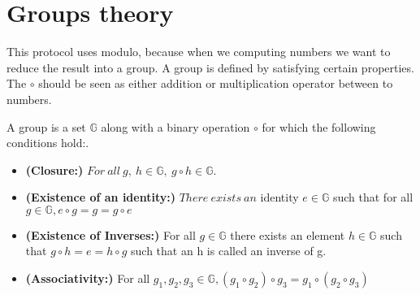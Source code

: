 \section{Groups theory}
This protocol uses modulo, because when we computing numbers we want to reduce the result into a group. A group is defined by satisfying certain properties. The \begin{math} \circ \end{math} should be seen as either addition or multiplication operator between to numbers. 
\begin{defi}
A \textnormal{group} is a set \begin{math}\mathbb{G}\end{math} along with a binary operation \begin{math}\circ \end{math} for which the following conditions hold:.
\begin{itemize}
\item \textnormal{\textbf{(Closure:)}}  \begin{math} For \ all \ g, \ h \in \mathbb{G},\ g \circ h \in \mathbb{G} \end{math}.
\item \textnormal{\textbf{(Existence of an identity:)}} \begin{math} There \ exists \ an \end{math} \textnormal{identity} \begin{math} e \in \mathbb{G} \end{math} such that for  all \begin{math} g \in \mathbb{G}, e \circ g = g =g \circ e \end{math}
\item \textnormal{\textbf{(Existence of Inverses:)}} For all \begin{math}g \in \mathbb{G}\end{math} there exists an element \begin{math}h \in \mathbb{G}\end{math} such that \begin{math}g \circ h = e =h \circ g \end{math} such that an h is called an \textnormal{inverse} of g.
\item \textnormal{\textbf{(Associativity:)}} For all \begin{math}g_1, g_2, g_3 \in \mathbb{G}, (g_1 \circ g_2) \circ g_3 = g_1 \circ( g_2 \circ g_3) \end{math}

\end{itemize}
\end{defi}

